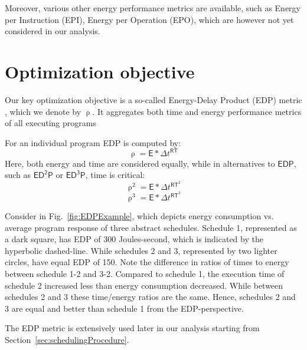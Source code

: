 Moreover, various other energy performance metrics are available, such as Energy per Instruction (EPI), Energy per Operation (EPO), which are however not yet considered in our analysis. 
	
	
\section{Optimization objective}
\label{sec:energyDelayProduct}
\label{sec:optimizationObjective}

Our key optimization objective is a so-called Energy-Delay Product (EDP) metric \cite{Ratkovic2015, Gonzalez1996}, which we denote by $\uprho$. It aggregates both time and energy performance metrics of all executing programs

For an individual program EDP is computed by:
%
\begin{equation}
\uprho = \mathsf{E} * \Delta t^\mathsf{RT}
\end{equation}
%
Here, both energy and time are considered equally, while in alternatives to $\mathsf{EDP}$, such as $\mathsf{ED^2P}$ or $\mathsf{ED^3P}$, time is critical:
%
\begin{equation}
\uprho^2 = \mathsf{E} * \Delta t^{\mathsf{RT}^2}
\end{equation}
%
%
\begin{equation}
\uprho^3 = \mathsf{E} * \Delta t^{\mathsf{RT}^3}
\end{equation}
%

Consider in Fig.~\ref{fig:EDPExample}, which depicts energy consumption vs. average program response of three abstract schedules. Schedule 1, represented as a dark square, has EDP of 300 Joules-second, which is indicated by the hyperbolic dashed-line. While schedules 2 and 3, represented by two lighter circles, have equal EDP of 150. Note the difference in ratios of times to energy between schedule 1-2 and 3-2. Compared to schedule 1, the execution time of schedule 2 increased less than energy consumption decreased. While between schedules 2 and 3 these time/energy ratios are the same. Hence, schedules 2 and 3 are equal and better than schedule 1 from the EDP-perspective.

The EDP metric is extensively used later in our analysis starting from Section~\ref{sec:schedulingProcedure}.



